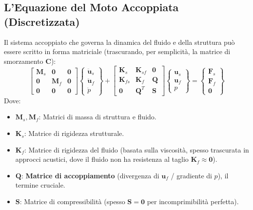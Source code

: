 \documentclass{article}
\begin{document}
\subsection{L'Equazione del Moto Accoppiata (Discretizzata)}

Il sistema accoppiato che governa la dinamica del fluido e della struttura può essere scritto in forma matriciale (trascurando, per semplicità, la matrice di smorzamento $\mathbf{C}$):
%
$$
\begin{bmatrix}
\mathbf{M}_s & \mathbf{0} & \mathbf{0} \\
\mathbf{0} & \mathbf{M}_f & \mathbf{0} \\
\mathbf{0} & \mathbf{0} & \mathbf{0}
\end{bmatrix}
\begin{Bmatrix}
\ddot{\mathbf{u}}_s \\ \ddot{\mathbf{u}}_f \\ \ddot{p}
\end{Bmatrix}
+
\begin{bmatrix}
\mathbf{K}_s & \mathbf{K}_{sf} & \mathbf{0} \\
\mathbf{K}_{fs} & \mathbf{K}_f & \mathbf{Q} \\
\mathbf{0} & \mathbf{Q}^T & \mathbf{S}
\end{bmatrix}
\begin{Bmatrix}
\mathbf{u}_s \\ \mathbf{u}_f \\ p
\end{Bmatrix}
=
\begin{Bmatrix}
\mathbf{F}_s \\ \mathbf{F}_f \\ \mathbf{0}
\end{Bmatrix}
$$
%
Dove:
\begin{itemize}
    \item $\mathbf{M}_s, \mathbf{M}_f$: Matrici di massa di struttura e fluido.
    \item $\mathbf{K}_s$: Matrice di rigidezza strutturale.
    \item $\mathbf{K}_f$: Matrice di rigidezza del fluido (basata sulla viscosità, spesso trascurata in approcci acustici, dove il fluido non ha resistenza al taglio $\mathbf{K}_f \approx \mathbf{0}$).
    \item $\mathbf{Q}$: \textbf{Matrice di accoppiamento} (divergenza di $\mathbf{u}_f$ / gradiente di $p$), il termine cruciale.
    \item $\mathbf{S}$: Matrice di compressibilità (spesso $\mathbf{S}=\mathbf{0}$ per incomprimibilità perfetta).
\end{itemize}
\end{document}
